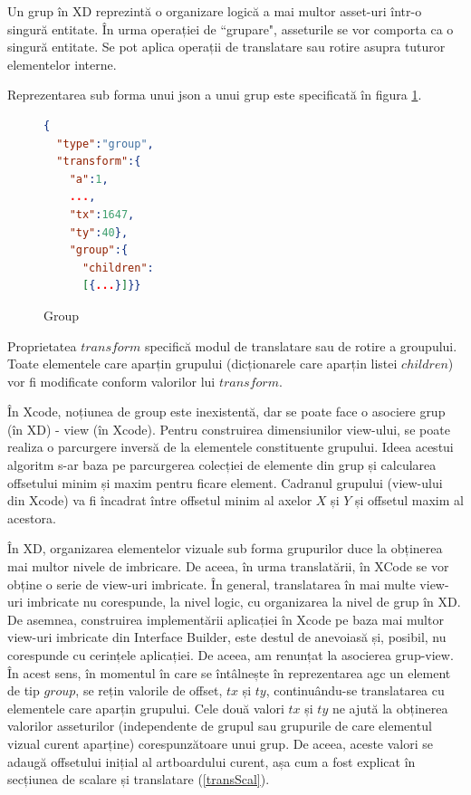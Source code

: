 Un grup în XD reprezintă o organizare logică a mai multor asset-uri într-o singură entitate. În urma operației de ``grupare", asseturile se vor comporta ca o singură entitate. Se pot aplica operații de translatare sau rotire asupra tuturor elementelor interne. 

Reprezentarea sub forma unui json a unui grup este specificată în figura \ref{fig:Group}. 

\begin{figure}[!htbp]
\begin{lstlisting}[language=json,firstnumber=1]
{
  "type":"group",
  "transform":{
    "a":1,
    ...,
    "tx":1647,
    "ty":40},
    "group":{
      "children":
      [{...}]}}
\end{lstlisting}
\caption{Group} \label{fig:Group}
\end{figure}

Proprietatea $transform$ specifică modul de translatare sau de rotire a groupului. Toate elementele care aparțin grupului (dicționarele care aparțin listei $children$) vor fi modificate conform valorilor lui $transform$.

În Xcode, noțiunea de group este inexistentă, dar se poate face o asociere grup (în XD) - view (în Xcode).  
Pentru construirea dimensiunilor view-ului, se poate realiza o parcurgere inversă de la elementele constituente grupului. Ideea acestui algoritm s-ar baza pe parcurgerea colecției de elemente din grup și calcularea offsetului minim și maxim pentru ficare element. Cadranul grupului (view-ului din Xcode) va fi încadrat între offsetul minim al axelor $X$ și $Y$ și offsetul maxim al acestora.

În XD, organizarea elementelor vizuale sub forma grupurilor duce la obținerea mai multor nivele de imbricare. De aceea, în urma translatării, în XCode se vor obține o serie de view-uri imbricate. În general, translatarea în mai multe view-uri imbricate nu corespunde, la nivel logic, cu organizarea la nivel de grup în XD. De asemnea, construirea implementării aplicației în Xcode pe baza mai multor view-uri imbricate din Interface Builder, este destul de anevoiasă și, posibil, nu corespunde cu cerințele aplicației. De aceea, am renunțat la asocierea grup-view. În acest sens, în momentul în care se întâlnește în reprezentarea agc un element de tip $group$, se rețin valorile de offset, $tx$ și $ty$, continuându-se translatarea cu elementele care aparțin grupului.  Cele două valori $tx$ și $ty$ ne ajută la obținerea valorilor asseturilor (independente de grupul sau grupurile de care elementul vizual curent aparține) corespunzătoare unui grup. De aceea, aceste valori se adaugă offsetului inițial al artboardului curent, așa cum a fost explicat în secțiunea de scalare și translatare (\ref{transScal}).

